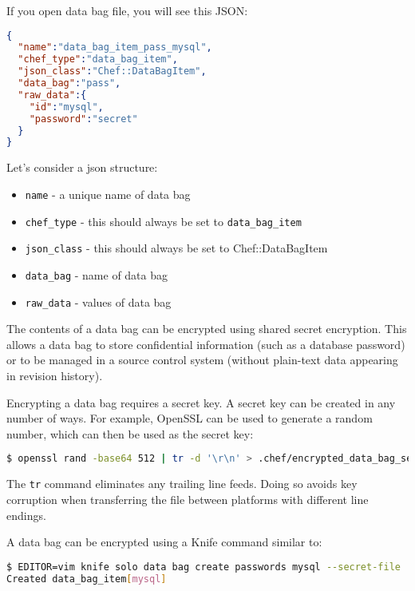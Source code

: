 If you open data bag file, you will see this JSON:

\begin{lstlisting}[language=JSON,label=lst:my-cloud-chef-databag10,title=my-cloud/data\_bags/pass/mysql.json]
{
  "name":"data_bag_item_pass_mysql",
  "chef_type":"data_bag_item",
  "json_class":"Chef::DataBagItem",
  "data_bag":"pass",
  "raw_data":{
    "id":"mysql",
    "password":"secret"
  }
}
\end{lstlisting}

Let's consider a json structure:

\begin{itemize}
  \item \lstinline!name! - a unique name of data bag
  \item \lstinline!chef_type! - this should always be set to \lstinline!data_bag_item!
  \item \lstinline!json_class! - this should always be set to Chef::DataBagItem
  \item \lstinline!data_bag! - name of data bag
  \item \lstinline!raw_data! - values of data bag
\end{itemize}

The contents of a data bag can be encrypted using shared secret encryption. This allows a data bag to store confidential information (such as a database password) or to be managed in a source control system (without plain-text data appearing in revision history).

Encrypting a data bag requires a secret key. A secret key can be created in any number of ways. For example, OpenSSL can be used to generate a random number, which can then be used as the secret key:

\begin{lstlisting}[language=Bash,label=lst:my-cloud-chef-databag5]
$ openssl rand -base64 512 | tr -d '\r\n' > .chef/encrypted_data_bag_secret
\end{lstlisting}

The \lstinline!tr! command eliminates any trailing line feeds. Doing so avoids key corruption when transferring the file between platforms with different line endings.

A data bag can be encrypted using a Knife command similar to:

\begin{lstlisting}[language=Bash,label=lst:my-cloud-chef-databag6]
$ EDITOR=vim knife solo data bag create passwords mysql --secret-file .chef/encrypted_data_bag_secret
Created data_bag_item[mysql]
\end{lstlisting}

